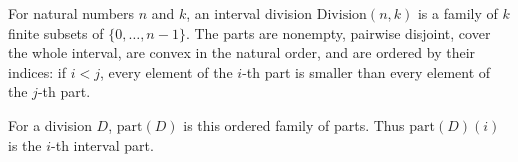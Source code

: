 For natural numbers \(n\) and \(k\), an interval division
\(\mathrm{Division}(n,k)\) is a family of \(k\) finite subsets of
\(\{0,\ldots,n-1\}\).  The parts are nonempty, pairwise disjoint, cover the
whole interval, are convex in the natural order, and are ordered by their
indices: if \(i<j\), every element of the \(i\)-th part is smaller than every
element of the \(j\)-th part.

For a division \(D\), \(\mathrm{part}(D)\) is this ordered family of parts.
Thus \(\mathrm{part}(D)(i)\) is the \(i\)-th interval part.
